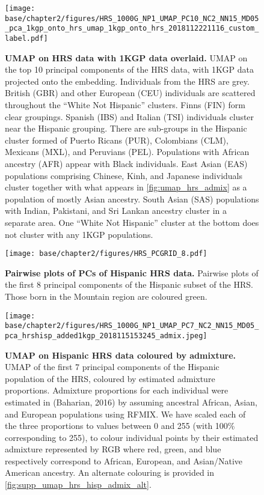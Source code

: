\begin{figure}[ht]
    \centering
    \texttt{[image: base/chapter2/figures/HRS\_1000G\_NP1\_UMAP\_PC10\_NC2\_NN15\_MD05\_pca\_1kgp\_onto\_hrs\_umap\_1kgp\_onto\_hrs\_2018112221116\_custom\_label.pdf]}
    \caption[UMAP on HRS data with 1KGP data overlaid]{\textbf{UMAP on HRS data with 1KGP data overlaid.} UMAP on the top 10 principal components of the HRS data, with 1KGP data projected onto the embedding. Individuals from the HRS are grey. British (GBR) and other European (CEU) individuals are scattered throughout the ``White Not Hispanic'' clusters. Finns (FIN) form clear groupings. Spanish (IBS) and Italian (TSI) individuals cluster near the Hispanic grouping. There are sub-groups in the Hispanic cluster formed of Puerto Ricans (PUR), Colombians (CLM), Mexicans (MXL), and Peruvians (PEL). Populations with African ancestry (AFR) appear with Black individuals. East Asian (EAS) populations comprising Chinese, Kinh, and Japanese individuals cluster together with what appears in \ref{fig:umap_hrs_admix} as a population of mostly Asian ancestry. South Asian (SAS) populations with Indian, Pakistani, and Sri Lankan ancestry cluster in a separate area. One ``White Not Hispanic'' cluster at the bottom does not cluster with any 1KGP populations.}
    \label{fig:supp_hrs_1kgp_projected}
\end{figure}

\newpage

\begin{figure}[ht]
    \centering
    \texttt{[image: base/chapter2/figures/HRS\_PCGRID\_8.pdf]}
    \caption[Pairwise plots of PCs of Hispanic HRS data]{\textbf{Pairwise plots of PCs of Hispanic HRS data.} Pairwise plots of the first 8 principal components of the Hispanic subset of the HRS. Those born in the Mountain region are coloured green.}
    \label{fig:supp_hrs_hisp_grid}
\end{figure}

\newpage

\begin{figure}[ht]
    \centering
    \texttt{[image: base/chapter2/figures/HRS\_1000G\_NP1\_UMAP\_PC7\_NC2\_NN15\_MD05\_pca\_hrshisp\_added1kgp\_2018115153245\_admix.jpeg]}
    \caption[UMAP on Hispanic HRS data coloured by admixture]{\textbf{UMAP on Hispanic HRS data coloured by admixture.} UMAP of the first 7 principal components of the Hispanic population of the HRS, coloured by estimated admixture proportions. Admixture proportions for each individual were estimated in (Baharian, 2016) by assuming ancestral African, Asian, and European populations using RFMIX. We have scaled each of the three proportions to values between 0 and 255 (with 100\% corresponding to 255), to colour individual points by their estimated admixture represented by RGB where red, green, and blue respectively correspond to African, European, and Asian/Native American ancestry. An alternate colouring is provided in \ref{fig:supp_umap_hrs_hisp_admix_alt}.}
    \label{fig:supp_umap_hrs_hisp_admix}
\end{figure}

